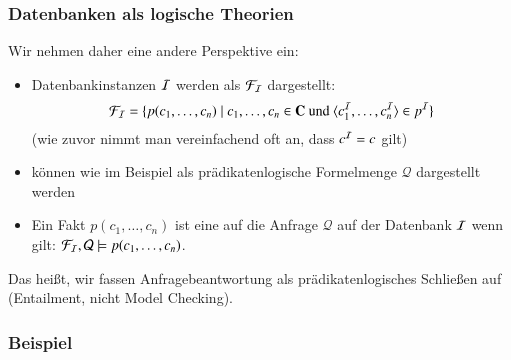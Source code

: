 \documentclass[aspectratio=1610,onlymath]{beamer}
\begin{document}
\begin{frame}\frametitle{Datenbanken als logische Theorien}

Wir nehmen daher eine andere Perspektive ein:
\begin{itemize}
\item Datenbankinstanzen $\mathcal{I}$ werden als  $\mathcal{F}_{\mathcal{I}}$ dargestellt:
\[ \mathcal{F}_{\mathcal{I}}= \{ p(c_1,\ldots,c_n)\mid c_1,\ldots,c_n\in\textbf{\textcolor{black}{C}}\text{ und }\langle{c_1^{\mathcal{I}},\ldots,c_n^{\mathcal{I}}}\rangle\in p^{\mathcal{I}}\}\]
\textcolor{devilscss}{(wie zuvor nimmt man vereinfachend oft an, dass $c^{\mathcal{I}}=c$ gilt)}
\item {} können wie im Beispiel als prädikatenlogische Formelmenge $\mathcal{Q}$ dargestellt werden
\item Ein Fakt $p(c_1,\ldots,c_n)$ ist eine  auf die Anfrage $\mathcal{Q}$ auf der Datenbank $\mathcal{I}$ wenn gilt: $\mathcal{F}_{\mathcal{I}},\mathcal{Q}\models p(c_1,\ldots,c_n)$.
\end{itemize}
Das heißt, wir fassen \alert{Anfragebeantwortung als prädikatenlogisches Schließen} auf (Entailment, nicht Model Checking).

\end{frame}

\begin{frame}\frametitle{Beispiel}


\end{frame}
\end{document}
